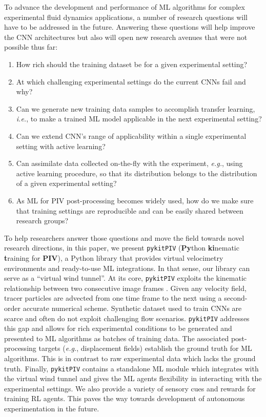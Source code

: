 \documentclass[a4paper,fleqn]{cas-dc}
\begin{document}
To advance the development and performance of ML algorithms for complex experimental fluid dynamics applications, a number of research questions will have to be addressed in the future. Answering these questions will help improve the CNN architectures but also will open new research avenues that were not possible thus far:
\begin{enumerate}
\item How rich should the training dataset be for a given experimental setting?
\item At which challenging experimental settings do the current CNNs fail and why?
\item Can we generate new training data samples to accomplish transfer learning, \textit{i.e.}, to make a trained ML model applicable in the next experimental setting?
\item Can we extend CNN's range of applicability within a single experimental setting with active learning?
\item Can assimilate data collected on-the-fly with the experiment, \textit{e.g.}, using active learning procedure, so that its distribution belongs to the distribution of a given experimental setting?
\item As ML for PIV post-processing becomes widely used, how do we make sure that training settings are reproducible and can be easily shared between research groups?
\end{enumerate}

To help researchers answer those questions and move the field towards novel research directions, in this paper, we present \texttt{pykitPIV} (\textbf{Py}thon \textbf{ki}nematic \textbf{t}raining for \textbf{PIV}), a Python library that provides virtual velocimetry environments and ready-to-use ML integrations. In that sense, our library can serve as a ``virtual wind tunnel''. At its core, \texttt{pykitPIV} exploits the kinematic relationship between two consecutive image frames \cite{manickathan2022kinematic}. Given any velocity field, tracer particles are advected from one time frame to the next using a second-order accurate numerical scheme. Synthetic dataset used to train CNNs are scarce and often do not exploit challenging flow scenarios. \texttt{pykitPIV} addresses this gap and allows for rich experimental conditions to be generated and presented to ML algorithms as batches of training data. The associated post-processing targets (\textit{e.g.}, displacement fields) establish the ground truth for ML algorithms. This is in contrast to raw experimental data which lacks the ground truth. Finally, \texttt{pykitPIV} contains a standalone ML module which integrates with the virtual wind tunnel and gives the ML agents flexibility in interacting with the experimental settings. We also provide a variety of sensory cues and rewards for training RL agents. This paves the way towards development of autonomous experimentation in the future.
\end{document}

